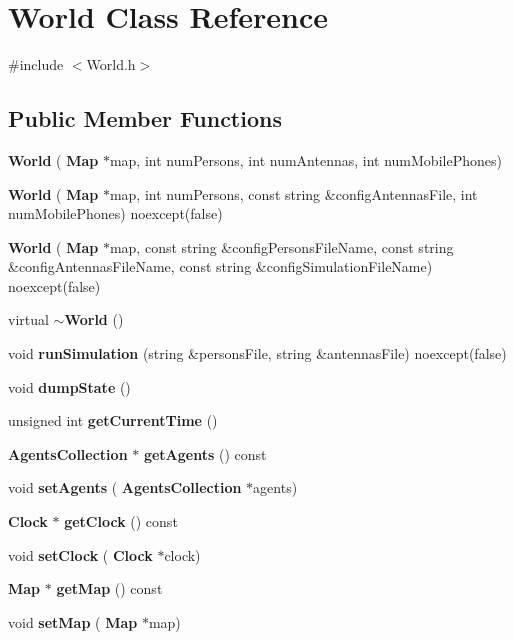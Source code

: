 \section{World Class Reference}
\label{class_world}


{\ttfamily \#include $<$World.\+h$>$}

\subsection*{Public Member Functions}
\begin{DoxyCompactItemize}
\item 
\textbf{ World} (\textbf{ Map} $\ast$map, int num\+Persons, int num\+Antennas, int num\+Mobile\+Phones)
\item 
\textbf{ World} (\textbf{ Map} $\ast$map, int num\+Persons, const string \&config\+Antennas\+File, int num\+Mobile\+Phones) noexcept(false)
\item 
\textbf{ World} (\textbf{ Map} $\ast$map, const string \&config\+Persons\+File\+Name, const string \&config\+Antennas\+File\+Name, const string \&config\+Simulation\+File\+Name) noexcept(false)
\item 
virtual \textbf{ $\sim$\+World} ()
\item 
void \textbf{ run\+Simulation} (string \&persons\+File, string \&antennas\+File) noexcept(false)
\item 
void \textbf{ dump\+State} ()
\item 
unsigned int \textbf{ get\+Current\+Time} ()
\item 
\textbf{ Agents\+Collection} $\ast$ \textbf{ get\+Agents} () const
\item 
void \textbf{ set\+Agents} (\textbf{ Agents\+Collection} $\ast$agents)
\item 
\textbf{ Clock} $\ast$ \textbf{ get\+Clock} () const
\item 
void \textbf{ set\+Clock} (\textbf{ Clock} $\ast$clock)
\item 
\textbf{ Map} $\ast$ \textbf{ get\+Map} () const
\item 
void \textbf{ set\+Map} (\textbf{ Map} $\ast$map)
\end{DoxyCompactItemize}
